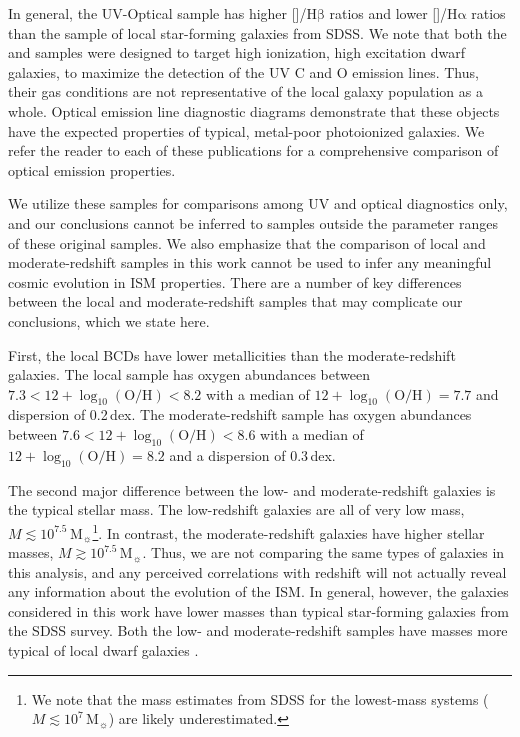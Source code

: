 \documentclass[trackchanges, preprint2]{aastex62}
\newcommand{\nii}{[\ion{N}{2}]}
\newcommand{\oiii}{[\ion{O}{3}]}
\newcommand\Msun{\ensuremath{\mathrm{M_{\sun}}}\xspace}
\newcommand{\ha}{\ensuremath{\mathrm{H\alpha}}\xspace}
\newcommand{\hb}{\ensuremath{\mathrm{H\beta}}\xspace}
\newcommand{\logten}{\ensuremath{\log_{10}}}
\newcommand{\logOH}{\ensuremath{\logten (\mathrm{O}/\mathrm{H})}\xspace}
\begin{document}
In general, the UV-Optical sample has higher \oiii{}/\hb{} ratios and lower \nii{}/\ha{} ratios than the sample of local star-forming galaxies from SDSS. We note that both the \citet{Berg+2016, Berg+2019} and \citet{Senchyna+2017, Senchyna+2019} samples were designed to target high ionization, high excitation dwarf galaxies, to maximize the detection of the UV C and O emission lines. Thus, their gas conditions are not representative of the local galaxy population as a whole. Optical emission line diagnostic diagrams demonstrate that these objects have the expected properties of typical, metal-poor photoionized galaxies. We refer the reader to each of these publications for a comprehensive comparison of optical emission properties.

We utilize these samples for comparisons among UV and optical diagnostics only, and our conclusions cannot be inferred to samples outside the parameter ranges of these original samples. We also emphasize that the comparison of local and moderate-redshift samples in this work cannot be used to infer any meaningful cosmic evolution in ISM properties. There are a number of key differences between the local and moderate-redshift samples that may complicate our conclusions, which we state here.

First, the local BCDs have lower metallicities than the moderate-redshift galaxies. The local sample has oxygen abundances between $7.3 < 12+\logOH < 8.2$ with a median of $12+\logOH = 7.7$ and dispersion of 0.2\,dex. The moderate-redshift sample has oxygen abundances between $7.6 < 12+\logOH < 8.6$ with a median of $12+\logOH = 8.2$ and a dispersion of 0.3\,dex.

The second major difference between the low- and moderate-redshift galaxies is the typical stellar mass. The low-redshift galaxies are all of very low mass, $M \lesssim 10^{7.5}$\,\Msun\footnote{We note that the mass estimates from SDSS for the lowest-mass systems ($M \lesssim 10^{7}$\,\Msun) are likely underestimated.}. In contrast, the moderate-redshift galaxies have higher stellar masses, $M \gtrsim 10^{7.5}$\,\Msun. Thus, we are not comparing the same types of galaxies in this analysis, and any perceived correlations with redshift will not actually reveal any information about the evolution of the ISM. In general, however, the galaxies considered in this work have lower masses than typical star-forming galaxies from the SDSS survey. Both the low- and moderate-redshift samples have masses more typical of local dwarf galaxies \citep[e.g.,][]{Lee+2006, Berg+2012}.
\end{document}
